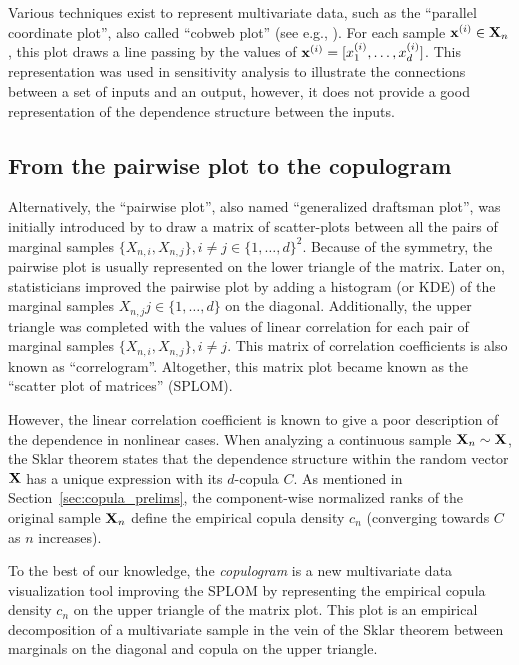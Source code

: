 Various techniques exist to represent multivariate data, such as the ``parallel coordinate plot'', also called ``cobweb plot'' (see e.g., \citealp{heinrich_2013_cobweb}). 
For each sample ${\bf x}^{(i)} \in {\bf X}_n$, this plot draws a line passing by the values of ${\bf x}^{(i)} = [x_1^{(i)}, \dots, x_d^{(i)}]$. 
This representation was used in sensitivity analysis to illustrate the connections between a set of inputs and an output, however, it does not provide a good representation of the dependence structure between the inputs. 

\subsection{From the pairwise plot to the copulogram}
Alternatively, the ``pairwise plot'', also named ``generalized draftsman plot'', was initially introduced by \citet{hartigan_1975_splom} to draw a matrix of scatter-plots between all the pairs of marginal samples $\{X_{n, i}, X_{n, j}\}, i \ne j \in \{1, \dots, d\}^2$. 
Because of the symmetry, the pairwise plot is usually represented on the lower triangle of the matrix. 
Later on, statisticians improved the pairwise plot by adding a histogram (or KDE) of the marginal samples $X_{n, j} j \in \{1, \dots, d\}$ on the diagonal. 
Additionally, the upper triangle was completed with the values of linear correlation for each pair of marginal samples $\{X_{n, i}, X_{n, j}\}, i \ne j$. 
This matrix of correlation coefficients is also known as ``correlogram''. 
Altogether, this matrix plot became known as the ``scatter plot of matrices'' (SPLOM). 

However, the linear correlation coefficient is known to give a poor description of the dependence in nonlinear cases. 
When analyzing a continuous sample ${\bf X}_n \sim {\bf X}$, the Sklar theorem states that the dependence structure within the random vector ${\bf X}$ has a unique expression with its $d$-copula $C$. 
As mentioned in Section~\ref{sec:copula_prelims}, the component-wise normalized ranks of the original sample ${\bf X}_n$ define the empirical copula density $c_n$ (converging towards $C$ as $n$ increases).

To the best of our knowledge, the \textit{copulogram} is a new multivariate data visualization tool improving the SPLOM by representing the empirical copula density $c_n$ on the upper triangle of the matrix plot. 
This plot is an empirical decomposition of a multivariate sample in the vein of the Sklar theorem between marginals on the diagonal and copula on the upper triangle.


